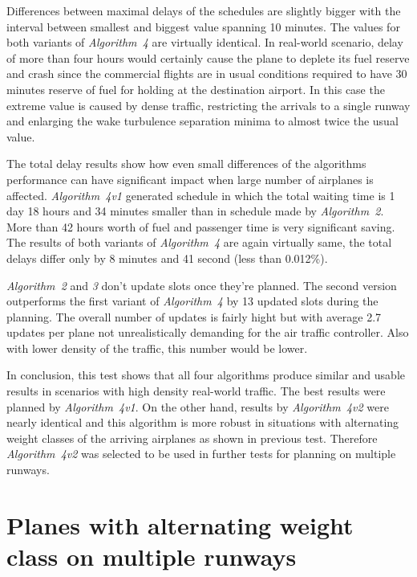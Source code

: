 Differences between maximal delays of the schedules are slightly bigger with the interval between smallest and biggest value spanning 10 minutes. The values for both variants of {\em Algorithm~4} are virtually identical. In real-world scenario, delay of more than four hours would certainly cause the plane to deplete its fuel reserve and crash since the commercial flights are in usual conditions required to have 30 minutes reserve of fuel for holding at the destination airport.\cite[Chapter 4]{annex6} In this case the extreme value is caused by dense traffic, restricting the arrivals to a single runway and enlarging the wake turbulence separation minima to almost twice the usual value.

The total delay results show how even small differences of the algorithms performance can have significant impact when large number of airplanes is affected. {\em Algorithm~4v1} generated schedule in which the total waiting time is 1 day 18 hours and 34 minutes smaller than in schedule made by {\em Algorithm~2}. More than 42 hours worth of fuel and passenger time is very significant saving. The results of both variants of {\em Algorithm~4} are again virtually same, the total delays differ only by 8 minutes and 41 second (less than 0.012\%).

{\em Algorithm~2} and {\em 3} don't update slots once they're planned. The second version outperforms the first variant of {\em Algorithm~4} by 13 updated slots during the planning. The overall number of updates is fairly hight but with average 2.7 updates per plane not unrealistically demanding for the air traffic controller. Also with lower density of the traffic, this number would be lower.

In conclusion, this test shows that all four algorithms produce similar and usable results in scenarios with high density real-world traffic. The best results were planned by {\em Algorithm~4v1}. On the other hand, results by {\em Algorithm~4v2} were nearly identical and this algorithm is more robust in situations with alternating weight classes of the arriving airplanes as shown in previous test. Therefore {\em Algorithm~4v2} was selected to be used in further tests for planning on multiple runways.

\section{Planes with alternating weight class on multiple runways}


